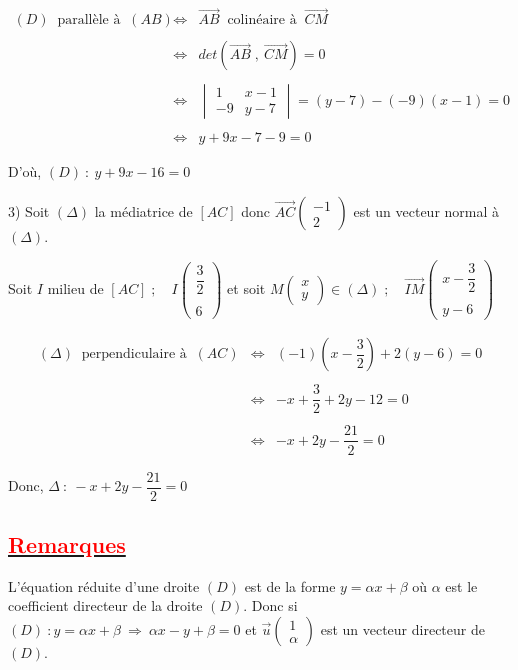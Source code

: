 \documentclass[12pt]{article}
\begin{document}
$$\begin{array}{rcl} (D)\ \text{ parallèle à }\ (AB)&\Leftrightarrow&\overrightarrow{AB}\ \text{ colinéaire à }\ \overrightarrow{CM} \\ \\ &\Leftrightarrow&det(\overrightarrow{AB}\;,\ \overrightarrow{CM})=0\\ \\ &\Leftrightarrow&\begin{vmatrix} 1&x-1 \\ -9&y-7\end{vmatrix}=(y-7)-(-9)(x-1)=0\\ \\ &\Leftrightarrow&y+9x-7-9=0 \end{array}$$

D'où, $(D)\ :\ y+9x-16=0$

3) Soit $(\Delta)$ la médiatrice de $[AC]$ donc $\overrightarrow{AC}\begin{pmatrix} -1 \\ 2\end{pmatrix}$ est un vecteur normal à $(\Delta).$

Soit $I$ milieu de $[AC]\;;\quad I\begin{pmatrix}\dfrac{3}{2} \\ \\ 6\end{pmatrix}$ et soit $M\begin{pmatrix} x \\ y\end{pmatrix}\in(\Delta)\;;\quad \overrightarrow{IM}\begin{pmatrix} x-\dfrac{3}{2} \\ \\ y-6\end{pmatrix}$

$$\begin{array}{rcl} (\Delta)\ \text{ perpendiculaire à }\ (AC)&\Leftrightarrow&(-1)\left(x-\dfrac{3}{2}\right)+2(y-6)=0 \\ \\ &\Leftrightarrow&-x+\dfrac{3}{2}+2y-12=0\\ \\ &\Leftrightarrow&-x+2y-\dfrac{21}{2}=0\end{array}$$

Donc, $\Delta\ :\ -x+2y-\dfrac{21}{2}=0$
\subsection*{\underline{\textcolor{red}{\textbf{Remarques}}}}
L'équation réduite d'une droite $(D)$ est de la forme $y=\alpha x+\beta$ où $\alpha$ est le coefficient directeur de la droite $(D)$. Donc si $(D) \: : y=\alpha x+\beta \: \Longrightarrow \: \alpha x-y+\beta=0$ et $\vec{u}\begin{pmatrix} 1\\ \alpha \end{pmatrix}$ est un vecteur directeur de $(D).$
\end{document}
